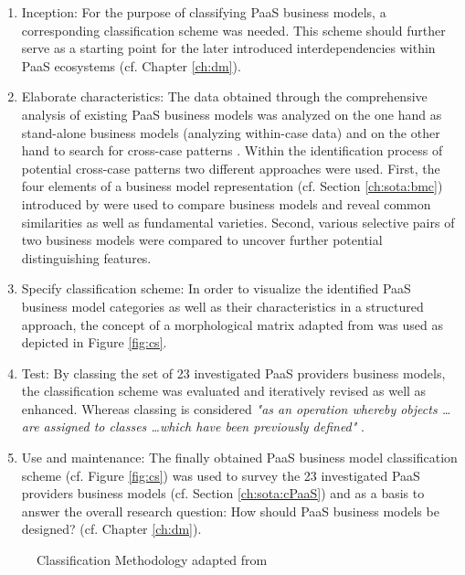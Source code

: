 \begin{enumerate}
	\item Inception: For the purpose of classifying \ac{PaaS} business models, a corresponding classification scheme was needed. This scheme should further serve as a starting point for the later introduced interdependencies within \ac{PaaS} ecosystems (cf. Chapter \ref{ch:dm}).

	\item Elaborate characteristics: The data obtained through the comprehensive analysis of existing \ac{PaaS} business models was analyzed on the one hand as stand-alone business models (analyzing within-case data) and on the other hand to search for cross-case patterns \citep[pp. 539-540]{Eisenhardt1989}. Within the identification process of potential cross-case patterns two different approaches were used. First, the four elements of a business model representation (cf. Section \ref{ch:sota:bmc}) introduced by \citet{Johnson2008} were used to compare business models and reveal common similarities as well as fundamental varieties. Second, various selective pairs of two business models were compared to uncover further potential distinguishing features. 

	\item Specify classification scheme: In order to visualize the identified \ac{PaaS} business model categories as well as their characteristics in a structured approach, the concept of a morphological matrix adapted from \citet{ Zwicky1969} was used as depicted in Figure \ref{fig:cs}.

	\item Test: By classing the set of 23 investigated \ac{PaaS} providers business models, the classification scheme was evaluated and iteratively revised as well as enhanced. Whereas classing is considered \textit{"as an operation whereby objects \ldots are assigned to classes \ldots which have been previously defined"} \citep[p. 130]{Marradi1990}.

	\item Use and maintenance: The finally obtained \ac{PaaS} business model classification scheme (cf. Figure \ref{fig:cs}) was used to survey the 23 investigated \ac{PaaS} providers business models (cf. Section \ref{ch:sota:cPaaS}) and as a basis to answer the overall research question: How should \ac{PaaS} business models be designed? (cf. Chapter \ref{ch:dm}).

\end{enumerate}

\begin{figure}[t]
	\centering
	
	\caption[Classification Methodology]{Classification Methodology adapted from \citet[p. 44]{Fettke2003}}
	\label{fig:cm}
\end{figure}

